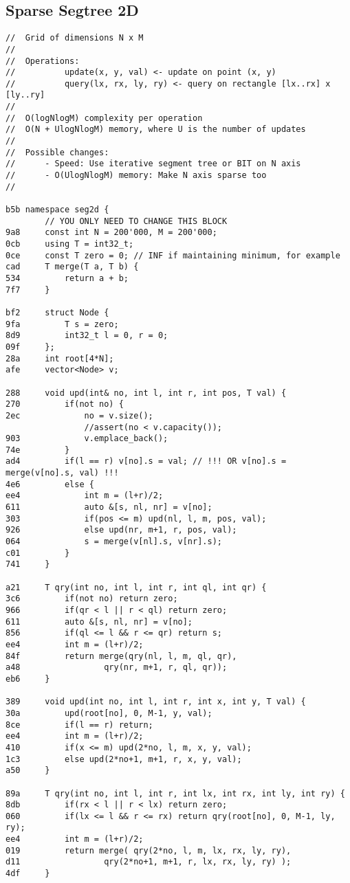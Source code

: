 \documentclass[11pt, a4paper, twoside]{article}
\begin{document}
\subsection{ Sparse Segtree 2D}
\begin{lstlisting}
//  Grid of dimensions N x M
//
//  Operations:
//          update(x, y, val) <- update on point (x, y)
//          query(lx, rx, ly, ry) <- query on rectangle [lx..rx] x [ly..ry]
//
//  O(logNlogM) complexity per operation
//  O(N + UlogNlogM) memory, where U is the number of updates
//
//  Possible changes:
//      - Speed: Use iterative segment tree or BIT on N axis
//      - O(UlogNlogM) memory: Make N axis sparse too
//

b5b namespace seg2d {
    	// YOU ONLY NEED TO CHANGE THIS BLOCK
9a8 	const int N = 200'000, M = 200'000;
0cb 	using T = int32_t;
0ce 	const T zero = 0; // INF if maintaining minimum, for example
cad 	T merge(T a, T b) {
534 		return a + b;
7f7 	}
    
bf2 	struct Node {
9fa 		T s = zero;
8d9 		int32_t l = 0, r = 0;
09f 	};
28a 	int root[4*N];
afe 	vector<Node> v;
    
288 	void upd(int& no, int l, int r, int pos, T val) {
270 		if(not no) {
2ec 			no = v.size();
    			//assert(no < v.capacity());
903 			v.emplace_back();
74e 		}
ad4 		if(l == r) v[no].s = val; // !!! OR v[no].s = merge(v[no].s, val) !!!
4e6 		else {
ee4 			int m = (l+r)/2;
611 			auto &[s, nl, nr] = v[no];
303 			if(pos <= m) upd(nl, l, m, pos, val);
926 			else upd(nr, m+1, r, pos, val);
064 			s = merge(v[nl].s, v[nr].s);
c01 		}
741 	}
    
a21 	T qry(int no, int l, int r, int ql, int qr) {
3c6 		if(not no) return zero;
966 		if(qr < l || r < ql) return zero;
611 		auto &[s, nl, nr] = v[no];
856 		if(ql <= l && r <= qr) return s;
ee4 		int m = (l+r)/2;
84f 		return merge(qry(nl, l, m, ql, qr),
a48 				qry(nr, m+1, r, ql, qr));
eb6 	}
    
389 	void upd(int no, int l, int r, int x, int y, T val) {
30a 		upd(root[no], 0, M-1, y, val);
8ce 		if(l == r) return;
ee4 		int m = (l+r)/2;
410 		if(x <= m) upd(2*no, l, m, x, y, val);
1c3 		else upd(2*no+1, m+1, r, x, y, val);
a50 	}
    
89a 	T qry(int no, int l, int r, int lx, int rx, int ly, int ry) {
8db 		if(rx < l || r < lx) return zero;
060 		if(lx <= l && r <= rx) return qry(root[no], 0, M-1, ly, ry);
ee4 		int m = (l+r)/2;
019 		return merge( qry(2*no, l, m, lx, rx, ly, ry),
d11 				qry(2*no+1, m+1, r, lx, rx, ly, ry) );
4df 	}
    

\end{lstlisting}
\end{document}
